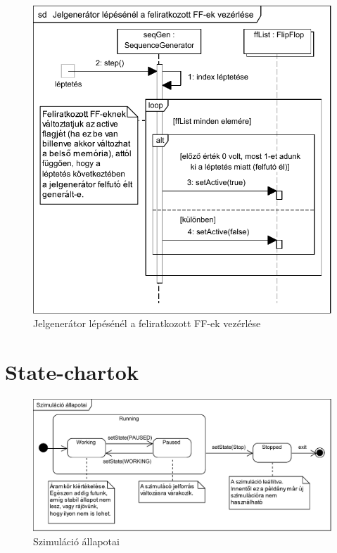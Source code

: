 \begin{figure}[H]
\begin{center}
\includegraphics{chapters/chapter03/seqdiagrams/ff_vez_on_clk.pdf}
\caption{Jelgenerátor lépésénél a feliratkozott FF-ek vezérlése}
\label{fig:ff_vez_on_clk}
\end{center}
\end{figure}

\section{State-chartok}

\begin{figure}[h]
\begin{center}
\includegraphics{chapters/chapter03/seqdiagrams/sim_states.pdf}
\caption{Szimuláció állapotai}
\label{fig:sim_states}
\end{center}
\end{figure}
